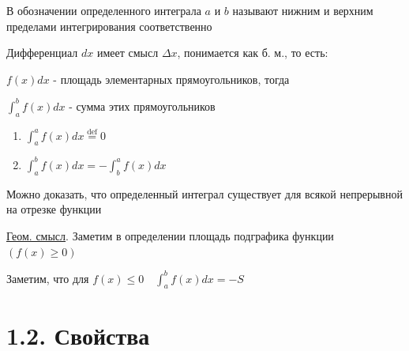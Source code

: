 \documentclass[12pt]{article}
\begin{document}
    В обозначении определенного интеграла $a$ и $b$ называют нижним и верхним пределами интегрирования соответственно

    Дифференциал $dx$ имеет смысл $\Delta x$, понимается как б. м., то есть:

    $f(x) dx$ - площадь элементарных прямоугольников, тогда

    $\int^b_a f(x) dx$ - сумма этих прямоугольников

    \vspace{5mm}

    \begin{enumerate}
        \item $\int_a^a f(x)dx \stackrel{\text{def}}{=} 0$
        \item $\int_a^b f(x)dx = -\int_b^a f(x)dx$
    \end{enumerate}

    Можно доказать, что определенный интеграл существует для всякой непрерывной на отрезке функции

    \underline{Геом. смысл}. Заметим в определении площадь подграфика функции $(f(x) \geq 0)$

    Заметим, что для $f(x) \leq 0 \quad \int_a^b f(x)dx = -S$


    \section{1.2. Свойства}
\end{document}
